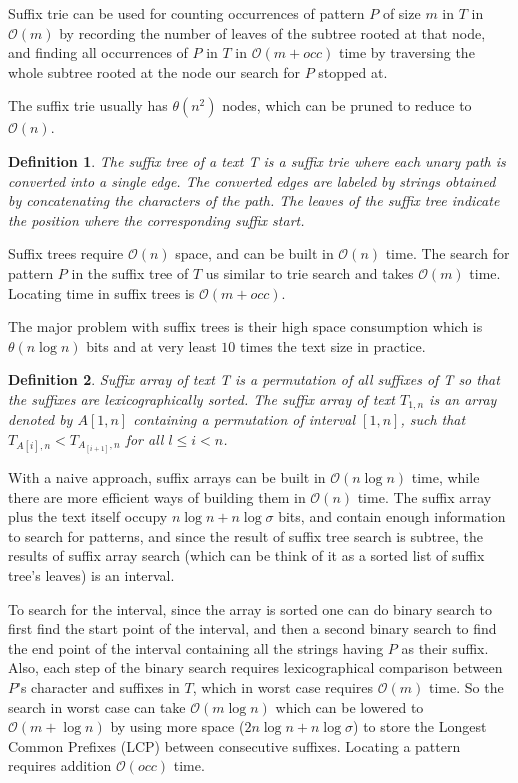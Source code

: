 \documentclass[11pt]{article}
\newtheorem{mydef}{Definition}
\begin{document}
Suffix trie can be used for counting occurrences of pattern $P$ of size $m$ in $T$ in $\mathcal{O}(m)$ by recording the number of leaves of the subtree rooted at that node, and finding all occurrences of $P$ in $T$ in $\mathcal{O}(m+occ)$ time by traversing the whole subtree rooted at the node our search for $P$ stopped at.

The suffix trie usually has $\mathcal{\theta}(n^2)$ nodes, which can be pruned to reduce to $\mathcal{O}(n)$.

\begin{mydef}
The suffix tree of a text T is a suffix trie where each unary path is converted into a single edge. The converted edges are labeled by strings obtained by concatenating the characters of the path. The leaves of the suffix tree indicate the position where the corresponding suffix start.
\end{mydef} 
Suffix trees require $\mathcal{O}(n)$ space, and can be built in $\mathcal{O}(n)$ time. The search for pattern $P$ in the suffix tree of $T$ us similar to trie search and takes $\mathcal{O}(m)$ time. Locating time in suffix trees is $\mathcal{O}(m+occ)$.

The major problem with suffix trees is their high space consumption which is  $\mathcal{\theta}(n\log n)$ bits and at very least $10$ times the text size in practice.

\begin{mydef}
Suffix array of text T is a permutation of all suffixes of T so that the suffixes are lexicographically sorted. The suffix array of text $T_{1,n}$ is an array denoted by $A[1,n]$ containing a permutation of interval $[1,n]$, such that $T_{A[i],n}<T_{A_[i+1],n}$ for all $l\leq i<n$.
\end{mydef}

With a naive approach, suffix arrays can be built in $\mathcal{O}(n\log n)$ time, while there are more efficient ways of building them in $\mathcal{O}(n)$ time. The suffix array plus the text itself occupy $n\log n + n\log\sigma$ bits, and contain enough information to search for patterns, and since the result of suffix tree search is subtree, the results of suffix array search (which can be think of it as a sorted list of suffix tree's leaves) is an interval. 

To search for the interval, since the array is sorted one can do binary search to first find the start point of the interval, and then a second binary search to find the end point of the interval containing all the strings having $P$ as their suffix. Also, each step of the binary search requires lexicographical comparison between $P$'s character and suffixes in $T$, which in worst case requires $\mathcal{O}(m)$ time. So the search in worst case can take $\mathcal{O}(m\log n)$ which can be lowered to $\mathcal{O}(m+\log n)$ by using more space ($2n\log n + n\log\sigma$) to store the Longest Common Prefixes (LCP) between consecutive suffixes. Locating a pattern requires addition $\mathcal{O}(occ)$ time.  
\end{document}

